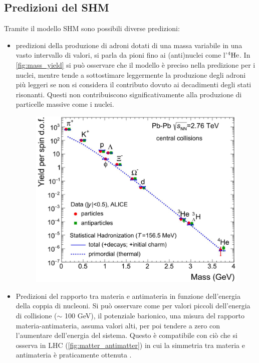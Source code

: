 \subsection{Predizioni del SHM}
Tramite il modello SHM sono possibili diverse predizioni:
\begin{itemize}
    \item predizioni della produzione di adroni dotati di una massa variabile in una vasto intervallo di valori, si parla da pioni fino ai (anti)nuclei come l'$^{4}{\rm He}$.
    In \autoref{fig:mass_yield} si può osservare che il modello è preciso nella predizione per i nuclei, mentre tende a sottostimare leggermente la produzione degli adroni più leggeri se non si considera il contributo dovuto ai decadimenti degli stati risonanti.
    Questi non contribuiscono significativamente alla produzione di particelle massive come i nuclei.
\begin{figure}[htpb]
    \centering
    \includegraphics[width=0.6\linewidth]{image/2-modelli/mass_yield.jpg}
    \label{fig:mass_yield}
\end{figure}
    \item Predizioni del rapporto tra materia e antimateria in funzione dell'energia della coppia di nucleoni.
    Si può osservare come per valori piccoli dell'energia di collisione ($\sim$ 100 GeV), il potenziale barionico, una misura del rapporto materia-antimateria, assuma valori alti, per poi tendere a zero con l'aumentare dell'energia del sistema.
    Questo è compatibile con ciò che si osserva in LHC (\autoref{fig:matter_antimatter}) in cui la simmetria tra materia e antimateria è praticamente ottenuta \cite{Tawfik_2011_matter_antimatter}.
\end{itemize}
